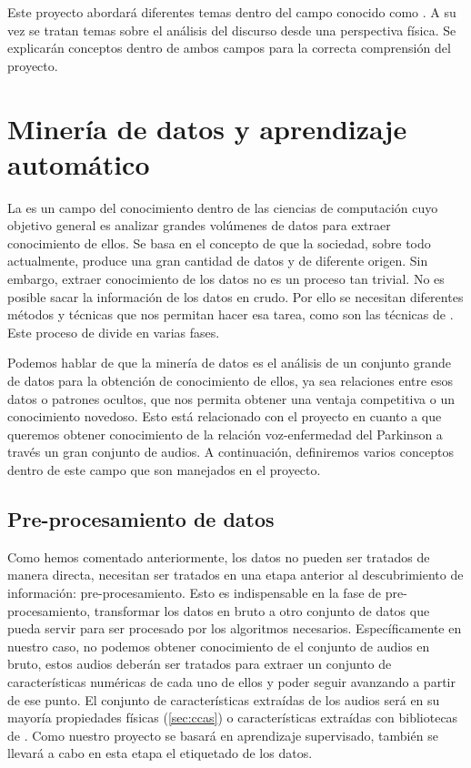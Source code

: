 
Este proyecto abordará diferentes temas dentro del campo conocido como . A su vez se tratan temas sobre el análisis del discurso desde una perspectiva física. Se explicarán conceptos dentro de ambos campos para la correcta comprensión del proyecto.


\section{Minería de datos y aprendizaje automático}

La  es un campo del conocimiento dentro de las ciencias de computación cuyo objetivo general es analizar grandes volúmenes de datos para extraer conocimiento de ellos. Se basa en el concepto de que la sociedad, sobre todo actualmente, produce una gran cantidad de datos y de diferente origen. Sin embargo, extraer conocimiento de los datos no es un proceso tan trivial. No es posible sacar la información de los datos en crudo. Por ello se necesitan diferentes métodos y técnicas que nos permitan hacer esa tarea, como son las técnicas de  \cite{datamining}. Este proceso de divide en varias fases.


Podemos hablar de que la minería de datos es el análisis de un conjunto grande de datos para la obtención de conocimiento de ellos, ya sea relaciones entre esos datos o patrones ocultos, que nos permita obtener una ventaja competitiva o un conocimiento novedoso. Esto está relacionado con el proyecto en cuanto a que queremos obtener conocimiento de la relación voz-enfermedad del Parkinson a través un gran conjunto de audios. A continuación, definiremos varios conceptos dentro de este campo que son manejados en el proyecto.

\subsection{Pre-procesamiento de datos}

Como hemos comentado anteriormente, los datos no pueden ser tratados de manera directa, necesitan ser tratados en una etapa anterior al descubrimiento de información: pre-procesamiento. Esto es indispensable en la fase de pre-procesamiento, transformar los datos en bruto a otro conjunto de datos que pueda servir para ser procesado por los algoritmos necesarios. Específicamente en nuestro caso, no podemos obtener conocimiento de el conjunto de audios en bruto, estos audios deberán ser tratados para extraer un conjunto de características numéricas de cada uno de ellos y poder seguir avanzando a partir de ese punto. El conjunto de características extraídas de los audios será en su mayoría propiedades físicas (\ref{sec:ccas}) o características extraídas con bibliotecas de . Como nuestro proyecto se basará en aprendizaje supervisado, también se llevará a cabo en esta etapa el etiquetado de los datos.

